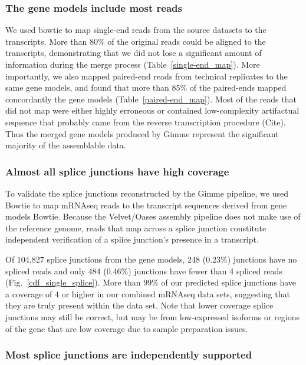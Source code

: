 \documentclass[10pt]{article}
\begin{document}
\subsubsection*{The gene models include most reads}

We used bowtie to map single-end reads from the source datasets to the
transcripts.  More than 80\% of the original reads could be aligned to
the transcripts, demonstrating that we did not lose a significant
amount of information during the merge process
(Table~\ref{single-end_map}).  More importantly, we also mapped
paired-end reads from technical replicates to the same gene models,
and found that more than 85\% of the paired-ends mapped concordantly
the gene models (Table~\ref{paired-end_map}).  Most of the reads that
did not map were either highly erroneous or contained low-complexity
artifactual sequence that probably came from the reverse transcription
procedure (Cite).
Thus the merged gene models produced by Gimme represent the significant
majority of the assemblable data.

\subsubsection*{Almost all splice junctions have high coverage}

To validate the splice junctions reconstructed by the Gimme pipeline,
we used Bowtie to map mRNAseq reads to the transcript sequences
derived from gene models Bowtie\cite{Langmead:2009fv}.  Because the
Velvet/Oases assembly pipeline does not make use of the reference
genome, reads that map across a splice junction constitute independent
verification of a splice junction's presence in a transcript.

Of 104,827 splice junctions from the gene models, 248 (0.23\%)
junctions have no spliced reads and only 484 (0.46\%) junctions
have fewer than 4 spliced reads (Fig.~\ref{cdf_single_splice}).
More than 99\% of our predicted splice junctions have a coverage
of 4 or higher in our combined mRNAseq data sets, suggesting that they are
truly present within the data set.  Note that lower coverage splice junctions
may still be correct, but may be from low-expressed isoforms or 
regions of the gene that are low coverage due to sample preparation issues.

\subsubsection*{Most splice junctions are independently supported}
\end{document}
